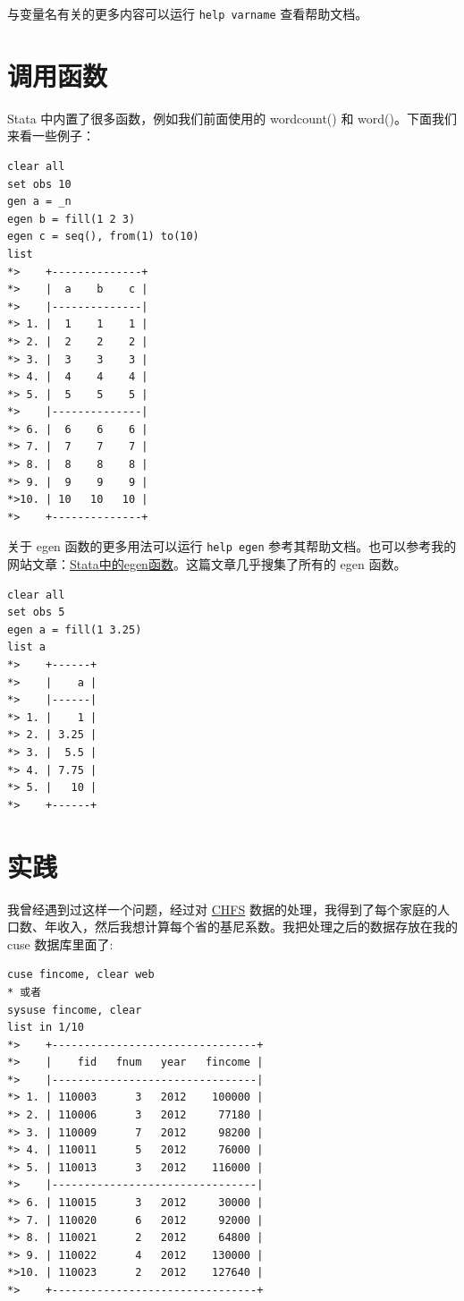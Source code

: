 与变量名有关的更多内容可以运行 \lstinline{help varname} 查看帮助文档。

\section{调用函数}

Stata 中内置了很多函数，例如我们前面使用的 wordcount() 和 word()。下面我们来看一些例子：

\begin{lstlisting}
clear all
set obs 10
gen a = _n
egen b = fill(1 2 3)
egen c = seq(), from(1) to(10)
list
*>    +--------------+
*>    |  a    b    c |
*>    |--------------|
*> 1. |  1    1    1 |
*> 2. |  2    2    2 |
*> 3. |  3    3    3 |
*> 4. |  4    4    4 |
*> 5. |  5    5    5 |
*>    |--------------|
*> 6. |  6    6    6 |
*> 7. |  7    7    7 |
*> 8. |  8    8    8 |
*> 9. |  9    9    9 |
*>10. | 10   10   10 |
*>    +--------------+
\end{lstlisting}

关于 egen 函数的更多用法可以运行 \texttt{help egen} 参考其帮助文档。也可以参考我的网站文章：\href{https://www.czxa.top/posts/18884/}{Stata中的egen函数}。这篇文章几乎搜集了所有的 egen 函数。

\begin{lstlisting}
clear all
set obs 5
egen a = fill(1 3.25)
list a
*>    +------+
*>    |    a |
*>    |------|
*> 1. |    1 |
*> 2. | 3.25 |
*> 3. |  5.5 |
*> 4. | 7.75 |
*> 5. |   10 |
*>    +------+
\end{lstlisting}

\section{实践}

我曾经遇到过这样一个问题，经过对 \href{https://chfs.swufe.edu.cn/}{CHFS} 数据的处理，我得到了每个家庭的人口数、年收入，然后我想计算每个省的基尼系数。我把处理之后的数据存放在我的 cuse 数据库里面了:

\begin{lstlisting}
cuse fincome, clear web
* 或者
sysuse fincome, clear
list in 1/10
*>    +--------------------------------+
*>    |    fid   fnum   year   fincome |
*>    |--------------------------------|
*> 1. | 110003      3   2012    100000 |
*> 2. | 110006      3   2012     77180 |
*> 3. | 110009      7   2012     98200 |
*> 4. | 110011      5   2012     76000 |
*> 5. | 110013      3   2012    116000 |
*>    |--------------------------------|
*> 6. | 110015      3   2012     30000 |
*> 7. | 110020      6   2012     92000 |
*> 8. | 110021      2   2012     64800 |
*> 9. | 110022      4   2012    130000 |
*>10. | 110023      2   2012    127640 |
*>    +--------------------------------+
\end{lstlisting}

